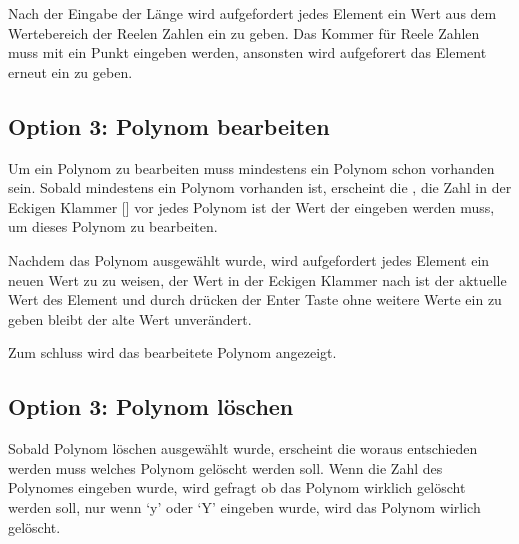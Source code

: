 \documentclass[letterpaper,10pt,ngerman]{sphinxmanual}
\begin{document}
Nach der Eingabe der Länge wird aufgefordert jedes Element ein Wert aus dem Wertebereich der Reelen Zahlen
ein zu geben. Das Kommer für Reele Zahlen muss mit ein Punkt eingeben werden, ansonsten wird aufgeforert
das Element erneut ein zu geben.



\subsection{Option 3: Polynom bearbeiten}
\label{menu:option-3-polynom-bearbeiten}
Um ein Polynom zu bearbeiten muss mindestens ein Polynom schon vorhanden sein. Sobald mindestens ein
Polynom vorhanden ist, erscheint die , die Zahl in der Eckigen Klammer {[}{]} vor jedes
Polynom ist der Wert der eingeben werden muss, um dieses Polynom zu bearbeiten.

Nachdem das Polynom ausgewählt wurde, wird aufgefordert jedes Element ein neuen Wert zu zu weisen,
der Wert in der Eckigen Klammer nach  ist der aktuelle Wert des Element und durch drücken
der Enter Taste ohne weitere Werte ein zu geben bleibt der alte Wert unverändert.

Zum schluss wird das bearbeitete Polynom angezeigt.



\subsection{Option 3: Polynom löschen}
\label{menu:option-3-polynom-loschen}
Sobald Polynom löschen ausgewählt wurde, erscheint die  woraus entschieden werden muss
welches Polynom gelöscht werden soll. Wenn die Zahl des Polynomes eingeben wurde, wird gefragt ob das
Polynom wirklich gelöscht werden soll, nur wenn `y' oder `Y' eingeben wurde, wird das Polynom wirlich
gelöscht.

\end{document}
